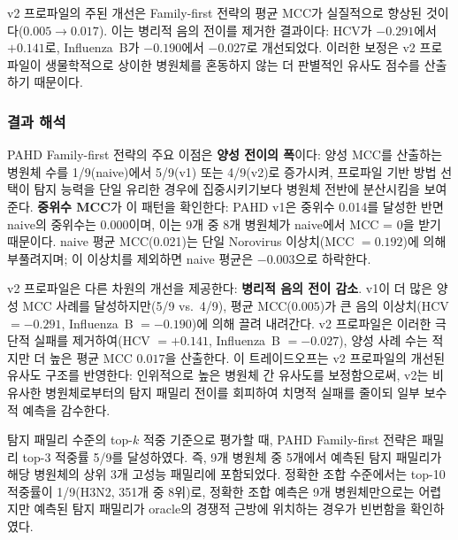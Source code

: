 v2 프로파일의 주된 개선은 Family-first 전략의 평균 MCC가 실질적으로 향상된 것이다($0.005 \rightarrow 0.017$). 이는 병리적 음의 전이를 제거한 결과이다: HCV가 $-0.291$에서 $+0.141$로, Influenza~B가 $-0.190$에서 $-0.027$로 개선되었다. 이러한 보정은 v2 프로파일이 생물학적으로 상이한 병원체를 혼동하지 않는 더 판별적인 유사도 점수를 산출하기 때문이다.

\subsubsection{결과 해석}

PAHD Family-first 전략의 주요 이점은 \textbf{양성 전이의 폭}이다: 양성 MCC를 산출하는 병원체 수를 1/9(naive)에서 5/9(v1) 또는 4/9(v2)로 증가시켜, 프로파일 기반 방법 선택이 탐지 능력을 단일 유리한 경우에 집중시키기보다 병원체 전반에 분산시킴을 보여준다.
\textbf{중위수 MCC}가 이 패턴을 확인한다: PAHD v1은 중위수 0.014를 달성한 반면 naive의 중위수는 0.000이며, 이는 9개 중 8개 병원체가 naive에서 MCC = 0을 받기 때문이다.
naive 평균 MCC(0.021)는 단일 Norovirus 이상치(MCC $= 0.192$)에 의해 부풀려지며; 이 이상치를 제외하면 naive 평균은 $-0.003$으로 하락한다.

v2 프로파일은 다른 차원의 개선을 제공한다: \textbf{병리적 음의 전이 감소}. v1이 더 많은 양성 MCC 사례를 달성하지만(5/9 vs.\ 4/9), 평균 MCC($0.005$)가 큰 음의 이상치(HCV $= -0.291$, Influenza~B $= -0.190$)에 의해 끌려 내려간다. v2 프로파일은 이러한 극단적 실패를 제거하여(HCV $= +0.141$, Influenza~B $= -0.027$), 양성 사례 수는 적지만 더 높은 평균 MCC $0.017$을 산출한다.
이 트레이드오프는 v2 프로파일의 개선된 유사도 구조를 반영한다: 인위적으로 높은 병원체 간 유사도를 보정함으로써, v2는 비유사한 병원체로부터의 탐지 패밀리 전이를 회피하여 치명적 실패를 줄이되 일부 보수적 예측을 감수한다.

탐지 패밀리 수준의 top-$k$ 적중 기준으로 평가할 때, PAHD Family-first 전략은 패밀리 top-3 적중률 5/9를 달성하였다. 즉, 9개 병원체 중 5개에서 예측된 탐지 패밀리가 해당 병원체의 상위 3개 고성능 패밀리에 포함되었다. 정확한 조합 수준에서는 top-10 적중률이 1/9(H3N2, 351개 중 8위)로, 정확한 조합 예측은 9개 병원체만으로는 어렵지만 예측된 탐지 패밀리가 oracle의 경쟁적 근방에 위치하는 경우가 빈번함을 확인하였다.

